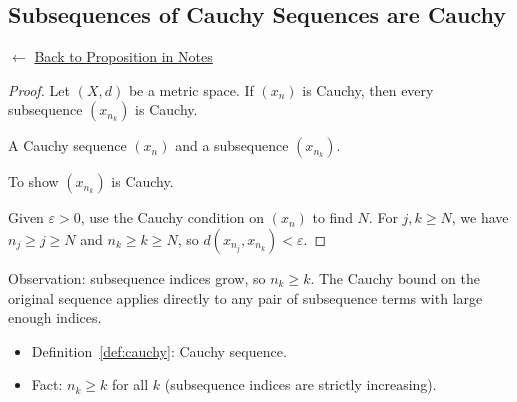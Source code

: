 
\subsection*{Subsequences of Cauchy Sequences are Cauchy}
\label{prf:cauchy-subsequence-cauchy}

\begin{remark*}[Return]
$\leftarrow$ \hyperref[prop:cauchy-subsequence-cauchy]{Back to Proposition in Notes}
\end{remark*}

\begin{proof}
\Claim Let $(X,d)$ be a metric space.
If $(x_n)$ is Cauchy, then every subsequence $(x_{n_k})$ is Cauchy.

\Given A Cauchy sequence $(x_n)$ and a subsequence $(x_{n_k})$.

\Goal To show $(x_{n_k})$ is Cauchy.

\Strategy Given $\varepsilon > 0$, use the Cauchy condition on $(x_n)$
to find $N$. For $j, k \ge N$, we have $n_j \ge j \ge N$ and
$n_k \ge k \ge N$, so $d(x_{n_j}, x_{n_k}) < \varepsilon$.


\end{proof}

\begin{remark*}
Observation: subsequence indices grow, so $n_k \ge k$.
The Cauchy bound on the original sequence applies directly to
any pair of subsequence terms with large enough indices.
\end{remark*}

\begin{remark*}[Dependencies]
\begin{itemize}
  \item Definition~\ref{def:cauchy}: Cauchy sequence.
  \item Fact: $n_k \ge k$ for all $k$ (subsequence indices are strictly increasing).
\end{itemize}
\end{remark*}
